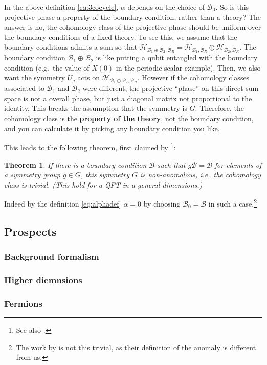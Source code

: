 \documentclass[
]{scrartcl}
\numberwithin{equation}{section}
\newtheorem{theorem}{Theorem}[section]
\theoremstyle{definition}
\theoremstyle{definition}
\theoremstyle{definition}
\theoremstyle{definition}
\theoremstyle{remark}
\begin{document}
In the above definition \eqref{eq:3cocycle}, \(\alpha\) depends on the choice of \(\mathcal{B}_0\). So is this projective phase a property of the boundary condition, rather than a theory?
The answer is no, the cohomology class of the projective phase should be uniform over the boundary conditions of a fixed theory.
To see this, we assume that the boundary conditions admits a sum so that \(\mathcal{H}_{\mathcal{B}_1\oplus \mathcal{B}_2,\mathcal{B}_R} = \mathcal{H}_{\mathcal{B}_1,\mathcal{B}_R} \oplus \mathcal{H}_{\mathcal{B}_2,\mathcal{B}_R}\).
The boundary condition \(\mathcal{B}_1\oplus \mathcal{B}_2\) is like
putting a qubit entangled with the boundary condition (e.g.~the value of \(X(0)\) in the periodic scalar example).
Then, we also want the symmetry \(U_g\) acts on \(\mathcal{H}_{\mathcal{B}_1\oplus \mathcal{B}_2,\mathcal{B}_R}\).
However if the cohomology classes associated to \(\mathcal{B}_1\) and \(\mathcal{B}_2\) were different, the projective ``phase'' on this direct sum space is not a overall phase, but just a diagonal matrix not proportional to the identity. This breaks the assumption that the symmetry is \(G\).
Therefore, the cohomology class is the \textbf{property of the theory}, not the boundary condition, and you can calculate it by picking any boundary condition you like.

This leads to the following theorem, first claimed by \textcite{Thorngren:2020yht} \footnote{See also \textcite{Hellerman:2021fla}.}:

\begin{theorem}
If there is a boundary condition \(\mathcal{B}\) such that \(g \mathcal{B} =\mathcal{B}\) for elements of a symmetry group \(g\in G\), this symmetry \(G\) is non-anomalous, i.e.~the cohomology class is trivial.
(This hold for a QFT in a general dimensions.)
\end{theorem}

Indeed by the definition \eqref{eq:alphadef} \(\alpha = 0\) by choosing \(\mathcal{B}_0 = \mathcal{B}\) in such a case.\footnote{The work by \textcite{Thorngren:2020yht} is not this trivial, as their definition of the anomaly is different from us.}

\hypertarget{prospects}{%
\subsection{Prospects}\label{prospects}}

\hypertarget{background-formalism}{%
\subsubsection{Background formalism}\label{background-formalism}}

\hypertarget{higher-diemnsions}{%
\subsubsection{Higher diemnsions}\label{higher-diemnsions}}

\hypertarget{fermions}{%
\subsubsection{Fermions}\label{fermions}}

\printbibliography
\end{document}
